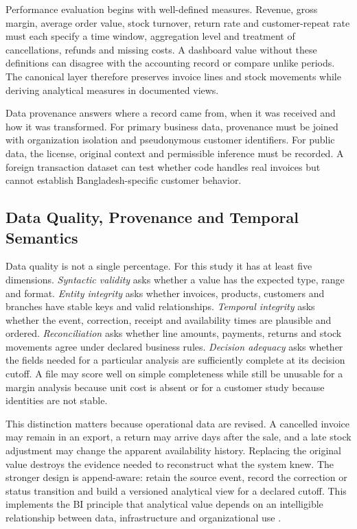 Performance evaluation begins with well-defined measures. Revenue, gross
margin, average order value, stock turnover, return rate and customer-repeat
rate must each specify a time window, aggregation level and treatment of
cancellations, refunds and missing costs. A dashboard value without these
definitions can disagree with the accounting record or compare unlike periods.
The canonical layer therefore preserves invoice lines and stock movements while
deriving analytical measures in documented views.

Data provenance answers where a record came from, when it was received and how
it was transformed. For primary business data, provenance must be joined with
organization isolation and pseudonymous customer identifiers. For public data,
the license, original context and permissible inference must be recorded. A
foreign transaction dataset can test whether code handles real invoices but
cannot establish Bangladesh-specific customer behavior.

\subsection{Data Quality, Provenance and Temporal Semantics}

Data quality is not a single percentage. For this study it has at least five
dimensions. \emph{Syntactic validity} asks whether a value has the expected
type, range and format. \emph{Entity integrity} asks whether invoices, products,
customers and branches have stable keys and valid relationships. \emph{Temporal
integrity} asks whether the event, correction, receipt and availability times
are plausible and ordered. \emph{Reconciliation} asks whether line amounts,
payments, returns and stock movements agree under declared business rules.
\emph{Decision adequacy} asks whether the fields needed for a particular
analysis are sufficiently complete at its decision cutoff. A file may score
well on simple completeness while still be unusable for a margin analysis
because unit cost is absent or for a customer study because identities are not
stable.

This distinction matters because operational data are revised. A cancelled
invoice may remain in an export, a return may arrive days after the sale, and a
late stock adjustment may change the apparent availability history. Replacing
the original value destroys the evidence needed to reconstruct what the system
knew. The stronger design is append-aware: retain the source event, record the
correction or status transition and build a versioned analytical view for a
declared cutoff. This implements the BI principle that analytical value depends
on an intelligible relationship between data, infrastructure and organizational
use \cite{chen2012business}.

